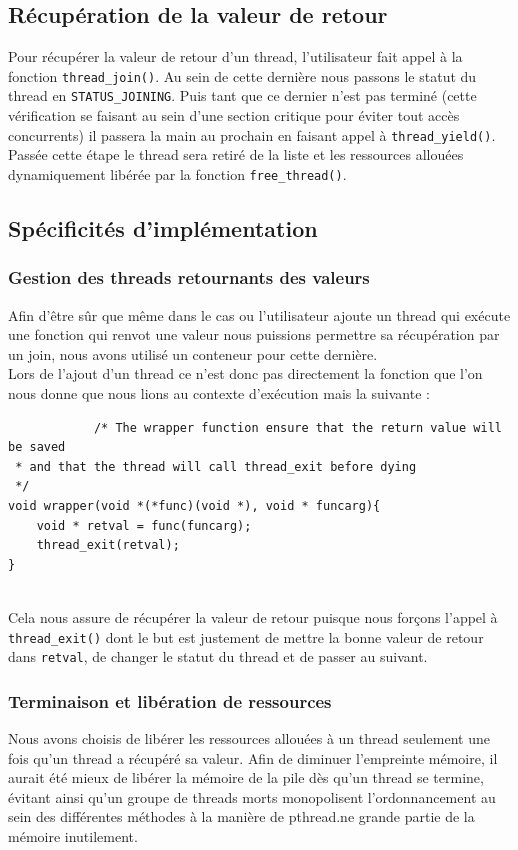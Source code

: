 \documentclass{article}
\begin{document}
		
		\subsection{Récupération de la valeur de retour}
		Pour récupérer la valeur de retour d'un thread, l'utilisateur fait 
		appel à la fonction \verb!thread_join()!. Au sein de cette dernière
		nous passons le statut du thread en \verb!STATUS_JOINING!. Puis
		tant que ce dernier n'est pas terminé (cette vérification se faisant
		au sein d'une section critique pour éviter tout accès concurrents)
		 il passera la main au prochain
		en faisant appel à \verb!thread_yield()!.
		Passée cette étape le thread sera retiré de la liste et les 
		ressources allouées dynamiquement libérée par la fonction
		\verb!free_thread()!.

		\subsection{Spécificités d'implémentation}
		
			\subsubsection{Gestion des threads retournants des valeurs}
			Afin d'être sûr que même dans le cas ou l'utilisateur ajoute un
			thread qui exécute une fonction qui renvot une valeur nous
			puissions permettre sa récupération par un join, nous avons 
			utilisé un conteneur pour cette dernière.\\
			Lors de l'ajout d'un thread ce n'est donc pas directement la
			fonction que l'on nous donne que nous lions au contexte
			d'exécution mais la suivante :
			\begin{verbatim}
			/* The wrapper function ensure that the return value will be saved                                                                                     
 * and that the thread will call thread_exit before dying
 */
void wrapper(void *(*func)(void *), void * funcarg){
    void * retval = func(funcarg);
    thread_exit(retval);
}	
			\end{verbatim} \\
			
			Cela nous assure de récupérer la valeur de retour puisque nous 
			forçons l'appel à \verb!thread_exit()! dont le but est justement
			de mettre la bonne valeur de retour dans \verb!retval!, de changer
			le statut du thread et de passer au suivant.
			
            \subsubsection{Terminaison et libération de ressources}
            Nous avons choisis de libérer les ressources allouées à un thread
            seulement une fois qu'un thread a récupéré sa valeur. Afin de
            diminuer l'empreinte mémoire, il aurait été mieux de libérer
            la mémoire de la pile dès qu'un thread se termine, évitant ainsi
            qu'un groupe de threads morts monopolisent
		    l'ordonnancement au sein des différentes méthodes à la manière
            de pthread.ne grande partie de
            la mémoire inutilement.
\end{document}
